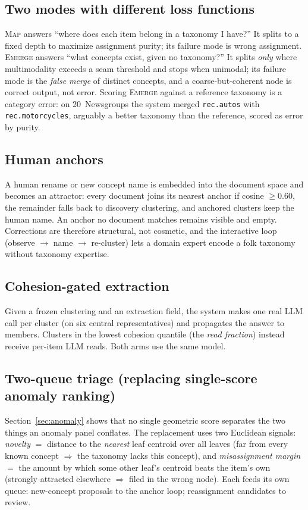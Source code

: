 \documentclass[11pt]{article}
\begin{document}
\subsection{Two modes with different loss functions}
\textsc{Map} answers ``where does each item belong in a taxonomy I have?'' It splits to a fixed depth to maximize assignment purity; its failure mode is wrong assignment. \textsc{Emerge} answers ``what concepts exist, given no taxonomy?'' It splits \emph{only} where multimodality exceeds a seam threshold and stops when unimodal; its failure mode is the \emph{false merge} of distinct concepts, and a coarse-but-coherent node is correct output, not error. Scoring \textsc{Emerge} against a reference taxonomy is a category error: on 20~Newsgroups the system merged \texttt{rec.autos} with \texttt{rec.motorcycles}, arguably a better taxonomy than the reference, scored as error by purity.

\subsection{Human anchors}
A human rename or new concept name is embedded into the document space and becomes an attractor: every document joins its nearest anchor if cosine $\geq 0.60$, the remainder falls back to discovery clustering, and anchored clusters keep the human name. An anchor no document matches remains visible and empty. Corrections are therefore structural, not cosmetic, and the interactive loop (observe $\rightarrow$ name $\rightarrow$ re-cluster) lets a domain expert encode a folk taxonomy without taxonomy expertise.

\subsection{Cohesion-gated extraction}
Given a frozen clustering and an extraction field, the system makes one real LLM call per cluster (on six central representatives) and propagates the answer to members. Clusters in the lowest cohesion quantile (the \emph{read fraction}) instead receive per-item LLM reads. Both arms use the same model.

\subsection{Two-queue triage (replacing single-score anomaly ranking)}
Section~\ref{sec:anomaly} shows that no single geometric score separates the two things an anomaly panel conflates. The replacement uses two Euclidean signals: \emph{novelty} $=$ distance to the \emph{nearest} leaf centroid over all leaves (far from every known concept $\Rightarrow$ the taxonomy lacks this concept), and \emph{misassignment margin} $=$ the amount by which some other leaf's centroid beats the item's own (strongly attracted elsewhere $\Rightarrow$ filed in the wrong node). Each feeds its own queue: new-concept proposals to the anchor loop; reassignment candidates to review.
\end{document}
